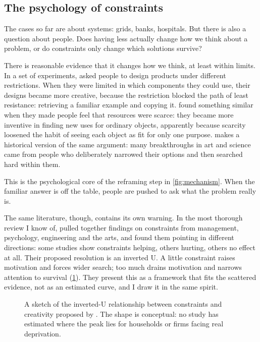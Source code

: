 \subsection{The psychology of constraints}
\label{sec:psychology}

The cases so far are about systems: grids, banks, hospitals. But there is also
a question about people. Does having less actually change how we think about a
problem, or do constraints only change which solutions survive?

There is reasonable evidence that it changes how we think, at least within
limits. In a set of experiments, \textcite{moreau2005} asked people to design
products under different restrictions. When they were limited in which
components they could use, their designs became more creative, because the
restriction blocked the path of least resistance: retrieving a familiar example
and copying it. \textcite{mehta2016} found something similar when they made
people feel that resources were scarce: they became more inventive in finding
new uses for ordinary objects, apparently because scarcity loosened the habit
of seeing each object as fit for only one purpose.
\textcite{stokes2006} makes a historical version of the same argument: many
breakthroughs in art and science came from people who deliberately narrowed
their options and then searched hard within them.

This is the psychological core of the reframing step in
\cref{fig:mechanism}. When the familiar answer is off the table, people are
pushed to ask what the problem really is.

The same literature, though, contains its own warning. In the most thorough
review I know of, \textcite{acar2019} pulled together findings on constraints
from management, psychology, engineering and the arts, and found them pointing
in different directions: some studies show constraints helping, others hurting,
others no effect at all. Their proposed resolution is an inverted U. A little
constraint raises motivation and forces wider search; too much drains
motivation and narrows attention to survival (\cref{fig:inverted-u}). They
present this as a framework that fits the scattered evidence, not as an
estimated curve, and I draw it in the same spirit.

\begin{figure}[htbp]
\centering

\caption{ A sketch of
the inverted-U relationship between constraints and creativity proposed by
\textcite{acar2019}. The shape is conceptual: no study has estimated where the
peak lies for households or firms facing real deprivation.
}
\label{fig:inverted-u}
\end{figure}

